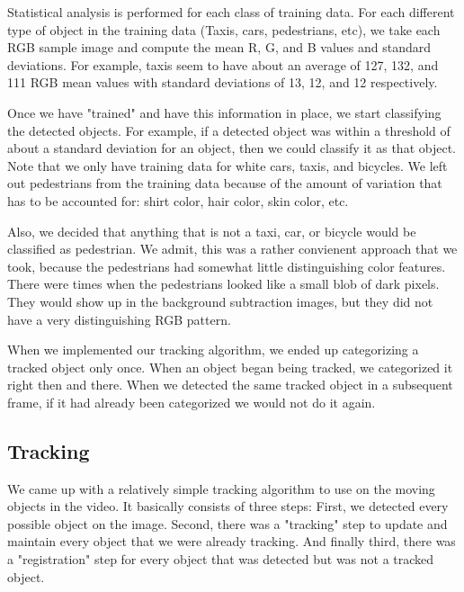 \documentclass[a4paper, 10pt, conference]{ieeeconf}      %
\begin{document}
Statistical analysis is performed for each class of training data. For each different type of object in the training data (Taxis, cars, pedestrians, etc), we take each RGB sample image and compute the mean R, G, and B values and standard deviations. For example, taxis seem to have about an average of 127, 132, and 111 RGB mean values with standard deviations of 13, 12, and 12 respectively. \newline

Once we have "trained" and have this information in place, we start classifying the detected objects. For example, if a detected object was within a threshold of about a standard deviation for an object, then we could classify it as that object. Note that we only have training data for white cars, taxis, and bicycles. We left out pedestrians from the training data because of the amount of variation that has to be accounted for: shirt color, hair color, skin color, etc. \newline

Also, we decided that anything that is not a taxi, car, or bicycle would be classified as pedestrian. We admit, this was a rather convienent approach that we took, because the pedestrians had somewhat little distinguishing color features. There were times when the pedestrians looked like a small blob of dark pixels. They would show up in the background subtraction images, but they did not have a very distinguishing RGB pattern.\newline

When we implemented our tracking algorithm, we ended up categorizing a tracked object only once. When an object began being tracked, we categorized it right then and there. When we detected the same tracked object in a subsequent frame, if it had already been categorized we would not do it again. \newline





\subsection{Tracking}

We came up with a relatively simple tracking algorithm to use on the moving objects in the video. It basically consists of three steps: First, we detected every possible object on the image. Second, there was a "tracking" step to update and maintain every object that we were already tracking. And finally third, there was a "registration" step for every object that was detected but was not a tracked object. 
\newline
\end{document}
